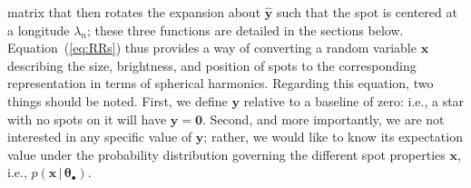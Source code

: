 \documentclass[modern]{aastex62}
\begin{document}
matrix that then rotates the
expansion about $\hat{\mathbf{y}}$ such that the spot is centered at a
longitude $\lambda_n$; these three functions are detailed in the sections below.
%
Equation~(\ref{eq:RRs}) thus provides a way of converting a random variable
$\mathbf{x}$ describing the size, brightness, and position of spots to the
corresponding representation in terms of spherical harmonics.
%
Regarding this equation,
two things should be noted. First, we define $\mathbf{y}$ relative to
a baseline of zero: i.e., a star with no spots on it will have
$\mathbf{y} = \mathbf{0}$. Second, and more importantly,
we are not interested in any specific value of
$\mathbf{y}$; rather, we would like to know its expectation value under
the probability distribution governing the different spot properties $\mathbf{x}$,
i.e., $p(\mathbf{x} \, \big| \, \pmb{\theta}_\bullet)$.
%
\end{document}
